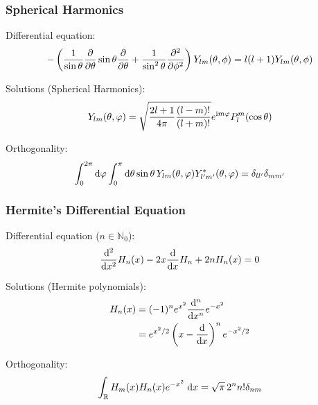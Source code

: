 		\subsubsection{Spherical Harmonics}
			\noindent
			Differential equation:
			\begin{equation}
				-\left(
				\frac{1}{\sin\theta}\frac{\partial }{\partial \theta}\sin\theta\frac{\partial }{\partial \theta} + \frac{1}{\sin^2\theta}\frac{\partial^2}{\partial \phi^2}
				\right)
				Y_{lm}(\theta,\phi) = l(l+1)Y_{lm}(\theta,\phi)
			\end{equation}

			\noindent
			Solutions (Spherical Harmonics):
			\begin{equation} \label{Eq:SphericalHarmonics}
				Y_{lm}(\theta,\varphi) = \sqrt{\frac{2l+1}{4\pi}\frac{(l-m)!}{(l+m)!}} e^{\mathrm{i} m\varphi} P_l^m(\cos\theta)
			\end{equation}

			\noindent
			Orthogonality:
			\begin{equation}
				\int_0^{2\pi}\mathrm{d}\varphi \int_0^{\pi}\mathrm{d}\theta \sin\theta\, Y_{lm}(\theta,\varphi) Y^{*}_{l'm'}(\theta,\varphi) = 	\delta_{ll'}\delta_{mm'}
			\end{equation}

		\subsubsection{Hermite's Differential Equation}
			\noindent
			Differential equation ($n\in\mathbb{N}_0$):
			\begin{equation}
				\frac{\mathrm{d}^2}{\mathrm{d} x^2} H_n(x) -2x\frac{\mathrm{d} }{\mathrm{d} x} H_n+2 n H_n(x)=0
			\end{equation}

			\noindent
			Solutions (Hermite polynomials):
			\begin{equation} \label{Eq:HermitePolynomials}
				\begin{aligned}
					H_n(x) &= (-1)^n e^{x^2} \frac{\mathrm{d}^n}{\mathrm{d} x^n}e^{-x^2} \\
					&= e^{x^2/2}\left(x-\frac{\mathrm{d} }{\mathrm{d} x}\right)^n e^{-x^2/2} \\
				\end{aligned}
			\end{equation}

			\noindent
			Orthogonality:
			\begin{equation}
				\int_{\mathbb{R}} H_m(x) H_n(x) e^{-x^2}\;\mathrm{d} x = \sqrt{\pi}\,2^n n!\delta_{nm}
			\end{equation}

